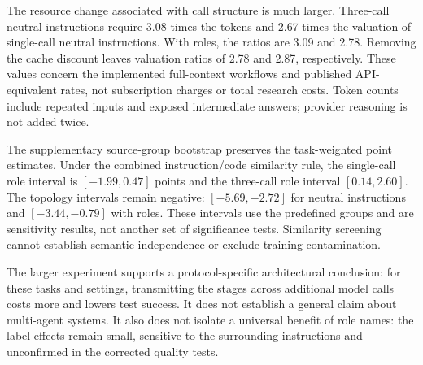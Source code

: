 The resource change associated with call structure is much larger. Three-call neutral instructions require 3.08 times the tokens and 2.67 times the valuation of single-call neutral instructions. With roles, the ratios are 3.09 and 2.78. Removing the cache discount leaves valuation ratios of 2.78 and 2.87, respectively. These values concern the implemented full-context workflows and published API-equivalent rates, not subscription charges or total research costs. Token counts include repeated inputs and exposed intermediate answers; provider reasoning is not added twice.

The supplementary source-group bootstrap preserves the task-weighted point estimates. Under the combined instruction/code similarity rule, the single-call role interval is $[-1.99,0.47]$ points and the three-call role interval $[0.14,2.60]$. The topology intervals remain negative: $[-5.69,-2.72]$ for neutral instructions and $[-3.44,-0.79]$ with roles. These intervals use the predefined groups and are sensitivity results, not another set of significance tests. Similarity screening cannot establish semantic independence or exclude training contamination.

The larger experiment supports a protocol-specific architectural conclusion: for these tasks and settings, transmitting the stages across additional model calls costs more and lowers test success. It does not establish a general claim about multi-agent systems. It also does not isolate a universal benefit of role names: the label effects remain small, sensitive to the surrounding instructions and unconfirmed in the corrected quality tests.
